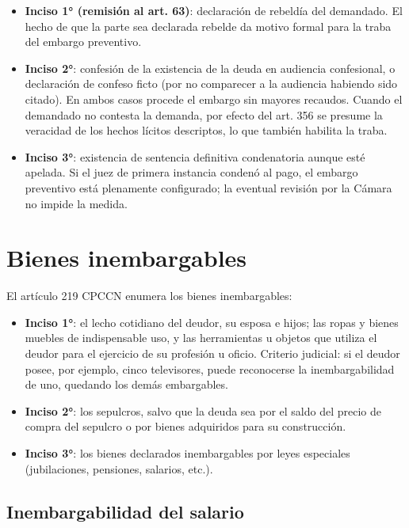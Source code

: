 \documentclass[12pt,oneside]{book}
\begin{document}
\begin{itemize}
    \item \textbf{Inciso 1° (remisión al art. 63)}: declaración de rebeldía del demandado. El hecho de que la parte sea declarada rebelde da motivo formal para la traba del embargo preventivo.
    \item \textbf{Inciso 2°}: confesión de la existencia de la deuda en audiencia confesional, o declaración de confeso ficto (por no comparecer a la audiencia habiendo sido citado). En ambos casos procede el embargo sin mayores recaudos. Cuando el demandado no contesta la demanda, por efecto del art. 356 se presume la veracidad de los hechos lícitos descriptos, lo que también habilita la traba.
    \item \textbf{Inciso 3°}: existencia de sentencia definitiva condenatoria aunque esté apelada. Si el juez de primera instancia condenó al pago, el embargo preventivo está plenamente configurado; la eventual revisión por la Cámara no impide la medida.
\end{itemize}

\section{Bienes inembargables}

\begin{important}
El artículo 219 CPCCN enumera los bienes inembargables:
\begin{itemize}
    \item \textbf{Inciso 1°}: el lecho cotidiano del deudor, su esposa e hijos; las ropas y bienes muebles de indispensable uso, y las herramientas u objetos que utiliza el deudor para el ejercicio de su profesión u oficio. Criterio judicial: si el deudor posee, por ejemplo, cinco televisores, puede reconocerse la inembargabilidad de uno, quedando los demás embargables.
    \item \textbf{Inciso 2°}: los sepulcros, salvo que la deuda sea por el saldo del precio de compra del sepulcro o por bienes adquiridos para su construcción.
    \item \textbf{Inciso 3°}: los bienes declarados inembargables por leyes especiales (jubilaciones, pensiones, salarios, etc.).
\end{itemize}
\end{important}

\subsection{Inembargabilidad del salario}
\end{document}

